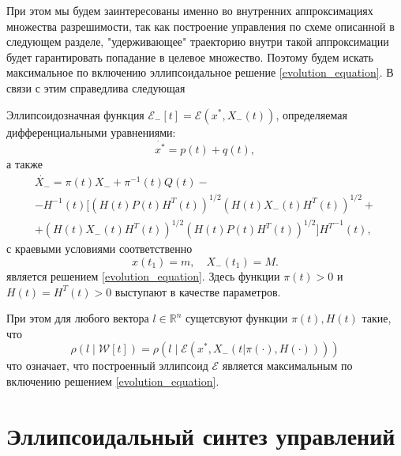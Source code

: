 При этом мы будем заинтересованы именно во внутренних аппроксимациях множества разрешимости, так как
 построение управления по схеме описанной в следующем разделе, "удерживающее" траекторию внутри такой
 аппроксимации будет гарантировать попадание в целевое множество. Поэтому будем искать максимальное 
 по включению эллипсоидальное решение \eqref{evolution_equation}. В связи с этим справедлива следующая

\begin{theorem}
    Эллипсоидозначная функция \( \mathcal{E}_-[t] = \mathcal{E}(x^*, X_-(t)) \), определяемая
     дифференциальными уравнениями:
    \begin{equation}\label{dif_center}
        \dot{x^*} = p(t) + q(t),
    \end{equation}
    а также
    \begin{equation}\label{dif_matrix}
        \begin{gathered}
            \dot{X_-} = \pi(t) X_- + \pi^{-1}(t) Q(t) - \\
             - H^{-1}(t) [(H(t) P(t) H^T(t))^{1/2} (H(t) X_-(t) H^T(t))^{1/2} + \\
             + (H(t) X_-(t) H^T(t))^{1/2}(H(t) P(t) H^T(t))^{1/2}] {H^T}^{-1}(t),
        \end{gathered}
    \end{equation}
    с краевыми условиями соответственно
    \begin{equation*}\label{dif_boundary}
        x(t_1) = m, \quad X_-(t_1) = M.
    \end{equation*}
    является решением \eqref{evolution_equation}. Здесь функции \( \pi(t) > 0 \) и \( H(t) = H^T(t) > 0 \)
     выступают в качестве параметров.
    
    При этом для любого вектора \( l \in \mathbb{R}^n \) сущетсвуют функции \( \pi(t), H(t) \) такие,
     что
    \begin{equation}
        \rho(l \mid \mathcal{W}[t]) = \rho(l \mid \mathcal{E}(x^*, X_-(t | \pi(\cdot), H(\cdot))))
    \end{equation}
    что означает, что построенный эллипсоид \( \mathcal{E} \) является максимальным по включению
     решением \eqref{evolution_equation}. 
\end{theorem}

\section{Эллипсоидальный синтез управлений}






